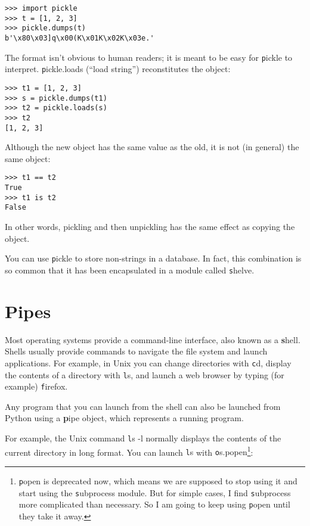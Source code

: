 \documentclass[
DIV=11,
fontsize=13,
twoside,
headinclude=false,
titlepage=firstiscover,
abstract=true,
headsepline=true,
footsepline=true,
chapterprefix=true, %
headings=big,
bibliography=totoc,%
captions=tableheading
]{scrbook}
\theoremstyle{definition}
\begin{document}
\begin{lstlisting}
>>> import pickle
>>> t = [1, 2, 3]
>>> pickle.dumps(t)
b'\x80\x03]q\x00(K\x01K\x02K\x03e.'
\end{lstlisting}
%
The format isn't obvious to human readers; it is meant to be
easy for {\texttt pickle} to interpret.  {\texttt pickle.loads}
(``load string'') reconstitutes the object:

\begin{lstlisting}
>>> t1 = [1, 2, 3]
>>> s = pickle.dumps(t1)
>>> t2 = pickle.loads(s)
>>> t2
[1, 2, 3]
\end{lstlisting}
%
Although the new object has the same value as the old, it is
not (in general) the same object:

\begin{lstlisting}
>>> t1 == t2
True
>>> t1 is t2
False
\end{lstlisting}
%
In other words, pickling and then unpickling has the same effect
as copying the object.

You can use {\texttt pickle} to store non-strings in a database.
In fact, this combination is so common that it has been
encapsulated in a module called {\texttt shelve}.  


\section{Pipes}

Most operating systems provide a command-line interface,
also known as a {\textbf shell}.  Shells usually provide commands
to navigate the file system and launch applications.  For
example, in Unix you can change directories with {\texttt cd},
display the contents of a directory with {\texttt ls}, and launch
a web browser by typing (for example) {\texttt firefox}.

Any program that you can launch from the shell can also be
launched from Python using a {\textbf pipe object}, which
represents a running program.

For example, the Unix command {\texttt ls -l} normally displays the
contents of the current directory in long format.  You can
launch {\texttt ls} with {\texttt os.popen}\footnote{{\texttt popen} is deprecated
now, which means we are supposed to stop using it and start using
the {\texttt subprocess} module.  But for simple cases, I find
{\texttt subprocess} more complicated than necessary.  So I am going
to keep using {\texttt popen} until they take it away.}:
\end{document}
